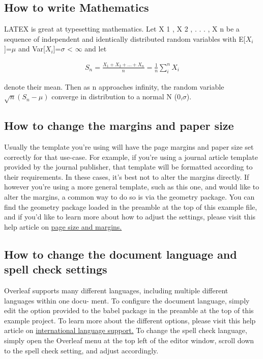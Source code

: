 \documentclass{article}
\begin{document}
\subsection{How to write Mathematics}
LATEX is great at typesetting mathematics. Let X 1 , X 2 , . . . , X n be a sequence of independent and
identically distributed random variables with E[$X_i$]=$\mu$  and Var[$X_i$]=$\sigma$ < $ \infty $
and let

\begin{align}
S_n=\frac{X_1+X_2+...+X_n}{n} = \frac{1}{n} \sum_{i}^{n} X_i
\end{align}

denote their mean. Then as n approaches infinity, the random variable \begin{math} \sqrt{n}(S_n-\mu)\end{math}
 converge in distribution to a normal N (0,$\sigma$).

\subsection{How to change the margins and paper size}
Usually the template you’re using will have the page margins and paper size set correctly for that
use-case. For example, if you’re using a journal article template provided by the journal publisher,
that template will be formatted according to their requirements. In these cases, it’s best not to alter
the margins directly.
If however you’re using a more general template, such as this one, and would like to alter the
margins, a common way to do so is via the geometry package. You can find the geometry package
loaded in the preamble at the top of this example file, and if you’d like to learn more about how to
adjust the settings, please visit this help article on \href{https://www.overleaf.com/learn/latex/page_size_and_margins}{page size and margins.}

\subsection{How to change the document language and spell check settings}
Overleaf supports many different languages, including multiple different languages within one docu-
ment.
To configure the document language, simply edit the option provided to the babel package in the
preamble at the top of this example project. To learn more about the different options, please visit
this help article on \href{https://www.overleaf.com/learn/latex/International_language_support}{ international language support.}
To change the spell check language, simply open the Overleaf menu at the top left of the editor
window, scroll down to the spell check setting, and adjust accordingly.
\end{document}
